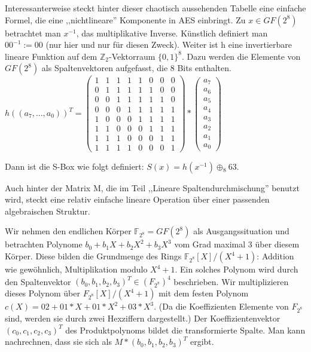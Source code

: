 \documentclass[a4paper]{article}
\begin{document}
\begin{multicols}{3}
    Interessanterweise steckt hinter dieser chaotisch aussehenden Tabelle eine einfache Formel, die eine ,,nichtlineare'' Komponente in AES einbringt. Zu $x\in GF(2^8)$ betrachtet man $x^{-1}$, das multiplikative Inverse. Künstlich definiert man $00^{-1}:= 00$ (nur hier und nur für diesen Zweck). Weiter ist h eine invertierbare lineare Funktion auf dem $\mathbb{Z}_2$-Vektorraum $\{0,1\}^8$. Dazu werden die Elemente von $GF(2^8)$ als Spaltenvektoren aufgefasst, die 8 Bits enthalten.
    $h((a_7,...,a_0))^T= \begin{pmatrix} 1& 1& 1& 1& 1& 0& 0& 0\\ 0& 1& 1& 1& 1& 1& 0& 0\\ 0& 0& 1& 1& 1& 1& 1& 0\\ 0& 0& 0& 1& 1& 1& 1& 1\\ 1& 0& 0& 0& 1& 1& 1& 1\\ 1& 1& 0& 0& 0& 1& 1& 1\\ 1& 1& 1& 0& 0& 0& 1& 1\\ 1& 1& 1& 1& 0& 0& 0& 1\end{pmatrix} * \begin{pmatrix} a_7\\ a_6\\a_5\\a_4\\a_3\\a_2\\a_1\\a_0\end{pmatrix}$

    Dann ist die S-Box wie folgt definiert: $S(x)=h(x^{-1})\oplus_8 63$.

    Auch hinter der Matrix M, die im Teil ,,Lineare Spaltendurchmischung'' benutzt wird, steckt eine relativ einfache lineare Operation über einer passenden algebraischen Struktur.

    Wir nehmen den endlichen Körper $\mathbb{F}_{2^8}=GF(2^8)$ als Ausgangssituation und betrachten Polynome $b_0+b_1X+b_2X^2+b_3X^3$ vom Grad maximal 3 über diesem Körper. Diese bilden die Grundmenge des Rings $\mathbb{F}_{2^8} [X]/(X^4+1)$: Addition wie gewöhnlich, Multiplikation modulo $X^4+1$. Ein solches Polynom wird durch den Spaltenvektor $(b_0,b_1,b_2,b_3)^T\in (F_{2^8})^4$ beschrieben. Wir multiplizieren dieses Polynom über $F_{2^8} [X]/(X^4+1)$ mit dem festen Polynom $c(X)=02+01*X+01*X^2+03*X^3$. (Da die Koeffizienten Elemente von $F_{2^8}$ sind, werden sie durch zwei Hexziffern dargestellt.) Der Koeffizientenvektor $(c_0,c_1,c_2,c_3)^T$ des Produktpolynoms bildet die transformierte Spalte. Man kann nachrechnen, dass sie sich als $M*(b_0,b_1,b_2,b_3)^T$ ergibt.


\end{multicols}
\end{document}
